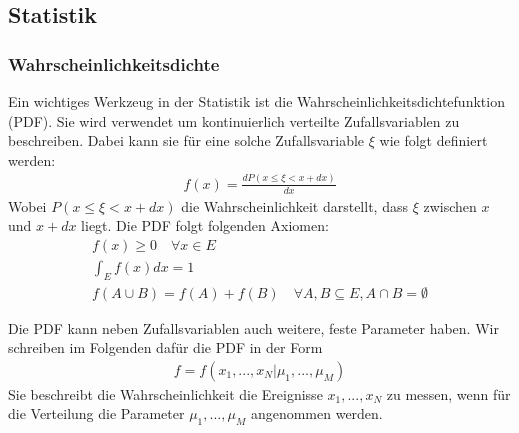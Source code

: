 \subsection{Statistik}
\subsubsection{Wahrscheinlichkeitsdichte}
Ein wichtiges Werkzeug in der Statistik ist die Wahrscheinlichkeitsdichtefunktion (PDF).
Sie wird verwendet um kontinuierlich verteilte Zufallsvariablen zu beschreiben.
Dabei kann sie für eine solche Zufallsvariable $\xi$ wie folgt definiert werden:
\begin{gather}
f(x) = \frac{dP\left (x\leq \xi <x+dx\right )}{dx}
\end{gather}
Wobei $P\left (x\leq \xi <x+dx\right )$ die Wahrscheinlichkeit darstellt, dass $\xi$ zwischen $x$ und $x+dx$ liegt.
Die PDF folgt folgenden Axiomen:
\begin{gather}
f(x) \geq 0 \quad \forall x \in E \\
\int_{E} f(x)dx = 1 \\
f(A \cup B) = f(A) + f(B) \quad \forall A,B \subseteq E, A \cap B = \emptyset
\end{gather}

Die PDF kann neben Zufallsvariablen auch weitere, feste Parameter haben.
Wir schreiben im Folgenden dafür die PDF in der Form
\begin{gather}
f = f(x_{1},...,x_{N}|\mu_{1},...,\mu_{M})
\end{gather}
Sie beschreibt die Wahrscheinlichkeit die Ereignisse $x_{1},...,x_{N}$ zu messen, wenn für die Verteilung die Parameter $\mu_{1},...,\mu_{M}$ angenommen werden.

